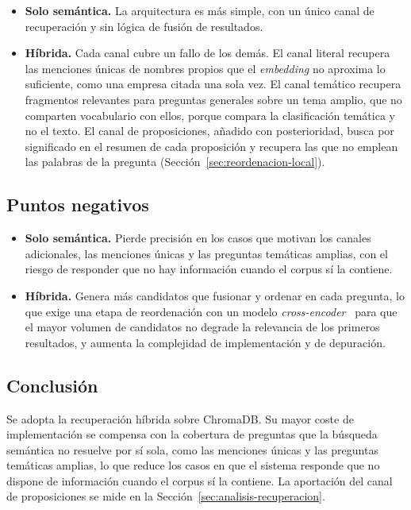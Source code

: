 \documentclass[11pt, a4paper]{report}
\begin{document}
	\begin{itemize}
		\item \textbf{Solo semántica.} La arquitectura es más simple, con un único
		canal de recuperación y sin lógica de fusión de resultados.
		\item \textbf{Híbrida.} Cada canal cubre un fallo de los demás. El canal
		literal recupera las menciones únicas de nombres propios que el
		\textit{embedding} no aproxima lo suficiente, como una empresa citada una
		sola vez. El canal temático recupera fragmentos relevantes para preguntas
		generales sobre un tema amplio, que no comparten vocabulario con ellos,
		porque compara la clasificación temática y no el texto. El canal de
		proposiciones, añadido con posterioridad, busca por significado en el
		resumen de cada proposición y recupera las que no emplean las palabras de
		la pregunta (Sección~\ref{sec:reordenacion-local}).
	\end{itemize}

	\subsection{Puntos negativos}

	\begin{itemize}
		\item \textbf{Solo semántica.} Pierde precisión en los casos que motivan
		los canales adicionales, las menciones únicas y las preguntas temáticas amplias, con el riesgo de responder que no hay información
		cuando el corpus sí la contiene.
		\item \textbf{Híbrida.} Genera más candidatos que fusionar y ordenar en
		cada pregunta, lo que exige una etapa de reordenación con un modelo
		\textit{cross-encoder}~\cite{nogueira2019-bert-rerank} para que el mayor
		volumen de candidatos no degrade la relevancia de los primeros resultados,
		y aumenta la complejidad de implementación y de depuración.
	\end{itemize}

	\subsection{Conclusión}

	Se adopta la recuperación híbrida sobre ChromaDB. Su mayor coste de implementación se compensa con la cobertura de preguntas
	que la búsqueda semántica no resuelve por sí sola, como las menciones únicas
	y las preguntas temáticas amplias, lo que reduce los casos en que el sistema
	responde que no dispone de información cuando el corpus sí la contiene. La
	aportación del canal de proposiciones se mide en la
	Sección~\ref{sec:analisis-recuperacion}.
\end{document}
